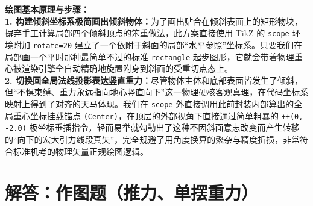 {\small\color{blue!70!black}
\textbf{绘图基本原理与步骤：}\\
\textbf{1. 构建倾斜坐标系极简画出倾斜物体：}为了画出贴合在倾斜表面上的矩形物块，摒弃手工计算局部四个倾斜顶点的笨重做法，此方案直接使用 TikZ 的 \texttt{scope} 环境附加 \texttt{rotate=20} 建立了一个依附于斜面的局部“水平参照”坐标系。只要我们在局部画一个平时那种最简单不过的标准 \texttt{rectangle} 起步图形，它就会带着物理重心被渲染引擎全自动精确地旋置附身到斜面的受重切点态上。\\
\textbf{2. 切换回全局法线投影表达竖直重力：}尽管物体主体和底部表面皆发生了倾斜，但“不惧束缚、重力永远指向地心竖直向下”这一物理硬核客观真理，在代码坐标系映射上得到了对齐的天马体现。我们在 \texttt{scope} 外直接调用此前封装内部算出的全局重心坐标挂载锚点 \texttt{(Center)}，在顶层的外部视角下直接通过简单粗暴的 \texttt{++(0, -2.0)} 极坐标垂插指令，轻而易举就勾勒出了这种不因斜面意志改变而产生转移的“向下的宏大引力线段真矢”，完全规避了用角度换算的繁杂与精度折损，非常符合标准机考的物理矢量正规绘图逻辑。
}



\section{解答：作图题（推力、单摆重力）}

\vspace{0.6cm}

